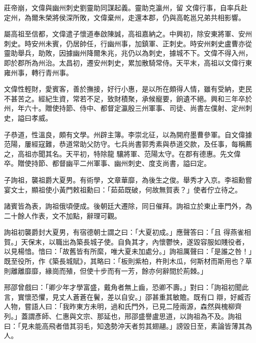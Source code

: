 \begin{pinyinscope}
 莊帝崩，文偉與幽州刺史劉靈助同謀起義。靈助克瀛州，留
 文偉行事，自率兵赴定州，為爾朱榮將侯深所敗，文偉棄州，走還本郡，仍與高乾邕兄弟共相影響。



 屬高祖至信都，文偉遣子懷道奉啟陳誠，高祖嘉納之。中興初，除安東將軍、安州刺史。時安州未賓，仍居帥任，行幽州事，加鎮軍、正刺史。時安州剌史盧曹亦從靈助舉兵，助敗，因據幽州降爾朱兆，兆仍以為刺史，據城不下。文偉不得入州，即於郡所為州治。太昌初，遷安州刺史，累加散騎常侍。天平末，高祖以文偉行東雍州事，轉行青州事。



 文偉性輕財，愛賓客，善於撫接，好行小惠，是以所在頗得人情，雖有受納，吏民不甚苦之。經紀生資，常若不足，致財積聚，承候寵要，餉遺不絕。興和三年卒於州，年六十。贈使持節、侍中、都督定瀛殷三州軍事、司徒、尚書左僕射、定州刺史，謚曰孝威。



 子恭道，性溫良，頗有文學。州辟主簿。李崇北征，以為開府墨曹參軍。自文偉據范陽，屢經寇難，恭道常助父防守。七兵尚書郭秀素與恭道交款，及任事，每稱薦之，高祖亦聞其名。天平初，特除龍
 驤將軍、范陽太守。在郡有德惠。先文偉卒。贈使持節、都督幽平二州軍事、幽州刺史、度支尚書，謚曰定。



 子詢祖，襲祖爵大夏男。有術學，文章華靡，為後生之俊。舉秀才入京。李祖勳嘗宴文士，顯祖使小黃門敕祖勳曰：「茹茹既破，何故無賀表？」使者佇立待之。



 諸賓皆為表，詢祖俄頃便成。後朝廷大遷除，同日催拜。詢祖立於東止車門外，為二十餘人作表，文不加點，辭理可觀。



 詢祖初襲爵封大夏男，有宿德朝士謂之曰：「大夏初成。」應聲答曰：「且
 得燕雀相賀。」天保末，以職出為築長城子使。自負其才，內懷鬱怏，遂毀容服如賤役者，以見楊愔。愔曰：「故舊皆有所縻，唯大夏未加處分。」詢祖厲聲曰：「是誰之咎！」既至役所，作《築長城賦》，其略曰：「板則紫柏，杵則木瓜，何斯材而斯用也？草則離離靡靡，緣崗而殖，但使十步而有一芳，餘亦何辭間於荊棘。」



 邢邵曾戲曰：「卿少年才學富盛，戴角者無上齒，恐卿不壽。」對曰：「詢祖初聞此言，實懷恐懼，見丈人蒼蒼在鬢，差以自安。」邵甚重其敏贍。既有口
 辯，好臧否人物，嘗語人曰：「我昨東方未明，過和氏門外，已見二陸兩源，森然與槐柳齊列。」蓋謂彥師、仁惠與文宗、那延也，邢邵盛譽盧思道，以詢祖為不及。詢祖曰：「見未能高飛者借其羽毛，知逸勢沖天者剪其翅翮。」謗毀日至，素論皆薄其為人。




\end{pinyinscope}
